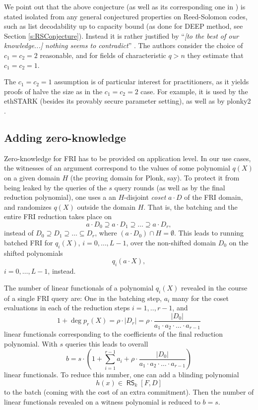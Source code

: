 \documentclass[11pt]{article}
\theoremstyle{definition}
\theoremstyle{remark}
\DeclareMathOperator{\RS}{\mathsf{RS}}
\begin{document}
We point out that the above conjecture (as well as its corresponding one in \cite{FRI}) is stated isolated from any general conjectured properties on Reed-Solomon codes, such as list decodability up to capacity bound (as done for DEEP method, see Section \ref{s:RSConjecture}). 
Instead it is rather justified by ``\textit{[to the best of our knowledge...] nothing seems to contradict}'' .
The authors consider the choice of $c_1=c_2=2$ reasonable, and for fields of characteristic $q>n$ they estimate that $c_1=c_2=1$. 

The $c_1=c_2=1$ assumption is of particular interest for practitioners, as it yields proofs of halve the size as in the $c_1=c_2=2$ case. For example, it is used by the ethSTARK \cite{ethSTARK} (besides its provably secure parameter setting), as well as by plonky2 \cite{PolygonZero}.


\subsection{Adding zero-knowledge}

Zero-knowledge for FRI has to be provided on application level. 
In our use cases, the witnesses of an argument correspond to the values of some polynomial $q(X)$ on a given domain $H$ (the proving domain for Plonk, say). 
To protect it from being leaked by the queries of the $s$ query rounds (as well as by the final reduction polynomial), one uses a an $H$-disjoint \textit{coset} $a\cdot D$ of the FRI domain, and randomizes $q(X)$ outside the domain $H$. 
That is, the batching and the entire FRI reduction takes place on 
\[
a\cdot D_0\supseteq a\cdot D_1 \supseteq \ldots \supseteq a\cdot D_{r}, 
\]
instead of $D_0\supseteq D_1 \supseteq \ldots \subseteq D_r$, where $(a\cdot D_0) \cap H=\emptyset$.
This leads to running batched FRI for $q_i(X)$, $i=0,\ldots, L-1$, over the non-shifted domain $D_0$ on the shifted polynomials
\[
q_i(a\cdot X), 
\]
$i=0,\ldots,L-1$, instead.

The number of linear functionals of a polynomial $q_i(X)$ revealed in the course of a single FRI query are:  
One in the batching step, $a_i$ many for the coset evaluations in each of the reduction steps $i=1,..,r-1$, and 
\[
1+ \deg p_r(X) = \rho\cdot |D_r| =  \rho\cdot\frac{ |D_0|}{a_1\cdot a_2\cdot \ldots \cdot a_{r-1}}
\] 
linear functionals corresponding to the coefficients of the final reduction polynomial.
With $s$ queries this leads to overall
\begin{equation}
b=s\cdot (1+ \sum_{i=1}^{r-1} a_i + \rho\cdot \frac{|D_0|}{a_1\cdot a_2\cdot \ldots \cdot a_{r-1}})
\end{equation}
linear functionals. To reduce this number, one can add a blinding polynomial 
\[
h(x) \in \RS_k[F,D] 
\]
to the batch (coming with the cost of an extra commitment). 
Then the number of linear functionals revealed on a witness polynomial is reduced to $b= s$. 
\end{document}
